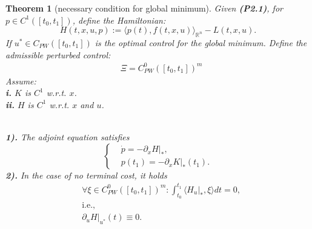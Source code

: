\documentclass[a4paper,11pt,fleqn]{book}
\newtheorem{theorem}{Theorem}[section]
\theoremstyle{definition}
\theoremstyle{remark}
\begin{document}
\begin{theorem}[necessary condition for global minimum]
Given \textbf{(P2.1)}, for $p \in C^1([t_0, t_1])$, define the Hamiltonian:
\begin{equation}
	H(t, x, u, p):= \langle p(t), f(t, x, u) \rangle_{\mathbb{R}^n} - L(t, x, u). 
\end{equation}
If $u^* \in C_{PW}([t_0, t_1])$ is the optimal control for the global minimum. Define the admissible perturbed control:
\begin{equation}
\begin{aligned}
	& \Xi = C_{PW}^0([t_0, t_1])^m
\end{aligned}
\end{equation}
Assume:\quad\\
\textbf{i.} $K$ is $C^1$ w.r.t. $x$. \quad\\
\textbf{ii.} $H$ is $C^1$ w.r.t. $x$ and $u$. 

\quad\\
\textbf{1).} The adjoint equation satisfies 
\begin{equation}
\left\{
\begin{aligned}
	& \dot{p} = - \partial_xH|_*,\\
	& p(t_1) = - \partial_x K|_* (t_1). 
\end{aligned}
\right.
\end{equation}
\textbf{2).} In the case of no terminal cost, it holds
\begin{equation*}
\begin{aligned}
	& \forall \xi \in C_{PW}^0([t_0, t_1])^m: \int_{t_0}^{t_1} \langle H_u|_*, \xi \rangle dt = 0, \\
	& \text{i.e., }\\
	& \partial_u H|_{u^*}(t) \equiv 0.
	\end{aligned}
\end{equation*}
\end{theorem}
\end{document}
